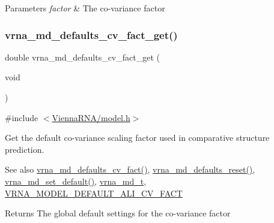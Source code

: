 \begin{DoxyParams}{Parameters}
{\em factor} & The co-\/variance factor \\
\hline
\end{DoxyParams}
\mbox{\label{group__model__details_gae59c68393807217b0a2497adb64d3ee3}} 
\subsubsection{\texorpdfstring{vrna\+\_\+md\+\_\+defaults\+\_\+cv\+\_\+fact\+\_\+get()}{vrna\_md\_defaults\_cv\_fact\_get()}}
{\footnotesize\ttfamily double vrna\+\_\+md\+\_\+defaults\+\_\+cv\+\_\+fact\+\_\+get (\begin{DoxyParamCaption}\item[{void}]{ }\end{DoxyParamCaption})}



{\ttfamily \#include $<$\hyperlink{model_8h}{Vienna\+R\+N\+A/model.\+h}$>$}



Get the default co-\/variance scaling factor used in comparative structure prediction. 

\begin{DoxySeeAlso}{See also}
\hyperlink{group__model__details_gad3a3f40baafd91a6ce80a91a68e20053}{vrna\+\_\+md\+\_\+defaults\+\_\+cv\+\_\+fact()}, \hyperlink{group__model__details_ga70834424cf804d149937de89f80ceb45}{vrna\+\_\+md\+\_\+defaults\+\_\+reset()}, \hyperlink{group__model__details_ga8ac6ff84936282436f822644bf841f66}{vrna\+\_\+md\+\_\+set\+\_\+default()}, \hyperlink{group__model__details_ga1f8a10e12a0a1915f2a4eff0b28ea17c}{vrna\+\_\+md\+\_\+t}, \hyperlink{group__model__details_gaaaf3d73d6abc18d3889676952bfedb96}{V\+R\+N\+A\+\_\+\+M\+O\+D\+E\+L\+\_\+\+D\+E\+F\+A\+U\+L\+T\+\_\+\+A\+L\+I\+\_\+\+C\+V\+\_\+\+F\+A\+CT} 
\end{DoxySeeAlso}
\begin{DoxyReturn}{Returns}
The global default settings for the co-\/variance factor 
\end{DoxyReturn}
\mbox{\label{group__model__details_gac35e596c850dce3ad55c49119fd7d471}} 
